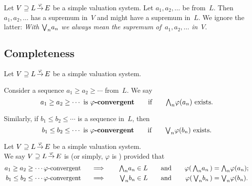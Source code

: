 \documentclass[main.tex]{subfiles}
\begin{document}
%
%
\begin{nt}
Let $V \supseteq L\,\smash{\stackrel{\varphi}{\rightarrow}}\,E$ be a simple valuation system.
Let $a_1, a_2, \dotsc$ be from~$L$.
Then $a_1, a_2,\dotsc$ has a supremum
in~$V$ and might have a supremum in~$L$.
We ignore the latter:
\emph{With $\textstyle{\bigvee}_n a_n$
we always mean the supremum of~$a_1, a_2,\dotsc $ in~$V$}.
\end{nt}
%
%
%
\subsection{Completeness}
%
%
\begin{dfn}
Let $V \supseteq L\,\smash{\stackrel{\varphi}{\rightarrow}}\,E$ be a simple valuation system.

Consider a sequence
$a_1 \geq a_2 \geq \dotsb$ from~$L$.
We say
\begin{equation*}
a_1 \geq a_2 \geq \dotsb \text{ is \textbf{$\varphi$-convergent}}
\qquad\text{if}\qquad \textstyle{\bigwedge}_n \varphi(a_n)\text{ exists.}
\end{equation*}

Similarly,
if
$b_1 \leq b_2 \leq \dotsb$ is
a sequence in~$L$, then 
\begin{equation*}
b_1 \leq b_2 \leq \dotsb \text{ is \textbf{$\varphi$-convergent}}
\qquad\text{if}\qquad \textstyle{\bigvee}_n \varphi(b_n)\text{ exists.}
\end{equation*}
\end{dfn}
%
%
\begin{dfn}
\label{D:system-complete}
Let $V \supseteq L\,\smash{\stackrel{\varphi}{\rightarrow}}\,E$ be a simple valuation system.\\
We say $V \supseteq L\,\smash{\stackrel{\varphi}{\rightarrow}}\,E$
is 
(or simply, $\varphi$ is )
 provided that
\begin{alignat*}{5}
a_1 \geq a_2 \geq \dotsb \text{$\varphi$-convergent }
  \quad &\implies \quad 
  & \textstyle{\bigwedge}_n a_n &\in L\quad 
  &&\text{and}\quad
  &\varphi(\,\textstyle{\bigwedge}_n a_n\,) &= \textstyle{\bigwedge}_n \varphi(a_n); \\
b_1 \leq b_2 \leq \dotsb \text{$\varphi$-convergent }
  \quad &\implies \quad 
  & \textstyle{\bigvee}_n b_n &\in L\quad 
  &&\text{and}\quad
  &\varphi(\,\textstyle{\bigvee}_n b_n\,) &= \textstyle{\bigvee}_n \varphi(b_n).
\end{alignat*}
\end{dfn}
%
%
\end{document}
